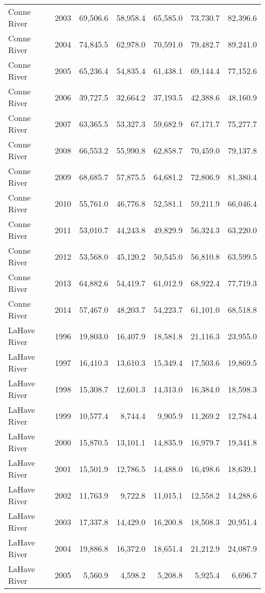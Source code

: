 \begin{longtable}{llrrrrr}
  Conne River & 2003 & 69,506.6 & 58,958.4 & 65,585.0 & 73,730.7 & 82,396.6 \\ 
  Conne River & 2004 & 74,845.5 & 62,978.0 & 70,591.0 & 79,482.7 & 89,241.0 \\ 
  Conne River & 2005 & 65,236.4 & 54,835.4 & 61,438.1 & 69,144.4 & 77,152.6 \\ 
  Conne River & 2006 & 39,727.5 & 32,664.2 & 37,193.5 & 42,388.6 & 48,160.9 \\ 
  Conne River & 2007 & 63,365.5 & 53,327.3 & 59,682.9 & 67,171.7 & 75,277.7 \\ 
  Conne River & 2008 & 66,553.2 & 55,990.8 & 62,858.7 & 70,459.0 & 79,137.8 \\ 
  Conne River & 2009 & 68,685.7 & 57,875.5 & 64,681.2 & 72,806.9 & 81,380.4 \\ 
  Conne River & 2010 & 55,761.0 & 46,776.8 & 52,581.1 & 59,211.9 & 66,046.4 \\ 
  Conne River & 2011 & 53,010.7 & 44,243.8 & 49,829.9 & 56,324.3 & 63,220.0 \\ 
  Conne River & 2012 & 53,568.0 & 45,120.2 & 50,545.0 & 56,810.8 & 63,599.5 \\ 
  Conne River & 2013 & 64,882.6 & 54,419.7 & 61,012.9 & 68,922.4 & 77,719.3 \\ 
  Conne River & 2014 & 57,467.0 & 48,203.7 & 54,223.7 & 61,101.0 & 68,518.8 \\ 
  LaHave River & 1996 & 19,803.0 & 16,407.9 & 18,581.8 & 21,116.3 & 23,955.0 \\ 
  LaHave River & 1997 & 16,410.3 & 13,610.3 & 15,349.4 & 17,503.6 & 19,869.5 \\ 
  LaHave River & 1998 & 15,308.7 & 12,601.3 & 14,313.0 & 16,384.0 & 18,598.3 \\ 
  LaHave River & 1999 & 10,577.4 & 8,744.4 & 9,905.9 & 11,269.2 & 12,784.4 \\ 
  LaHave River & 2000 & 15,870.5 & 13,101.1 & 14,835.9 & 16,979.7 & 19,341.8 \\ 
  LaHave River & 2001 & 15,501.9 & 12,786.5 & 14,488.0 & 16,498.6 & 18,639.1 \\ 
  LaHave River & 2002 & 11,763.9 & 9,722.8 & 11,015.1 & 12,558.2 & 14,288.6 \\ 
  LaHave River & 2003 & 17,337.8 & 14,429.0 & 16,200.8 & 18,508.3 & 20,951.4 \\ 
  LaHave River & 2004 & 19,886.8 & 16,372.0 & 18,651.4 & 21,212.9 & 24,087.9 \\ 
  LaHave River & 2005 & 5,560.9 & 4,598.2 & 5,208.8 & 5,925.4 & 6,696.7 \\ 

\end{longtable}
